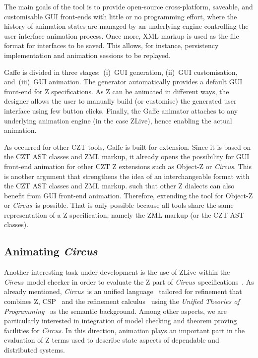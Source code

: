 \documentclass{llncs}
\newcommand{\Circus}{{\sf\slshape Circus}}
\begin{document}
    The main goals of the tool is to provide open-source cross-platform, saveable, and
    customisable GUI front-ends with little or no programming effort, where the
    history of animation states are managed by an underlying engine controlling the
    user interface animation process.
    Once more, XML markup is used as the file format for interfaces to be saved.
    This allows, for instance, persistency implementation and animation sessions
    to be replayed.

    Gaffe is divided in three stages:~(i)~GUI generation, (ii)~GUI customisation,
    and~(iii)~GUI animation. The generator automatically provides a default GUI front-end
    for Z specifications. As Z can be animated in different ways, the designer allows the
    user to manually build (or customise) the generated user interface using few button clicks.
    Finally, the Gaffe animator attaches to any underlying animation engine (in the case ZLive),
    hence enabling the actual animation.

    As occurred for other CZT tools, Gaffe is built for extension.
    Since it is based on the CZT AST classes and ZML markup, it already opens the possibility
    for GUI front-end animation for other CZT Z extensions such as Object-Z or \Circus.
    This is another argument that strengthens the idea of an interchangeable format with
    the CZT AST classes and ZML markup.
     such that other Z dialects
    can also benefit from GUI front-end animation. Therefore, extending the tool for Object-Z
    or \Circus\ is possible. That is only possible because all tools share the same
    representation of a Z specification, namely the ZML markup (or the CZT AST classes).

\subsection{Animating \Circus}

    Another interesting task under development is the use of ZLive within the \Circus\ model checker
    in order to evaluate the Z part of \Circus\ specifications~\cite{circus.mc:leo}.
    As already mentioned, \Circus\ is an unified language~\cite{circus.sem:intro} tailored for refinement
    that combines Z, CSP~\cite{csp.books:roscoe} and the refinement calculus~\cite{fm.ref:morgan}
    using the \textit{Unified Theories of Programming}~\cite{hoare.utp} as the semantic background.
    Among other aspects, we are particularly interested in integration of model checking and
    theorem proving facilities for \Circus. In this direction, animation plays an important part
    in the evaluation of Z terms used to describe state aspects of dependable and distributed systems.
\end{document}
